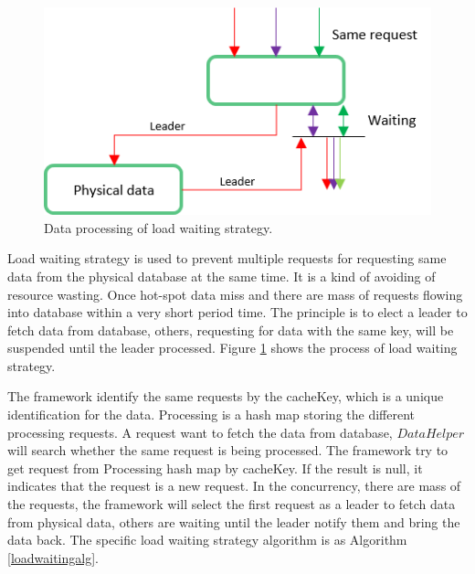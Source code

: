 \documentclass{singlecol-new}
\theoremstyle{TH}{
\newtheorem{lemma}{Lemma}
\newtheorem{theorem}[lemma]{Theorem}
\newtheorem{corrolary}[lemma]{Corrolary}
\newtheorem{conjecture}[lemma]{Conjecture}
\newtheorem{proposition}[lemma]{Proposition}
\newtheorem{claim}[lemma]{Claim}
\newtheorem{stheorem}[lemma]{Wrong Theorem}
}
\theoremstyle{THrm}{
\newtheorem{definition}{Definition}[section]
\newtheorem{question}{Question}[section]
\newtheorem{remark}{Remark}
\newtheorem{scheme}{Scheme}
}
\theoremstyle{THhit}{
\newtheorem{case}{Case}[section]
}
\begin{document}
\begin{figure} [htb]
\centering
\includegraphics[width=0.8\linewidth]{img/loadwaiting}
\caption{\label{loadwaiting}Data processing of load waiting strategy.}
\end{figure}

Load waiting strategy is used to prevent multiple requests for requesting same data from the physical database at the same time. It is a kind of avoiding of resource wasting. Once hot-spot data miss and there are mass of requests flowing into database within a very short period time. The principle is to elect a leader to fetch data from database, others, requesting for data with the same key, will be suspended until the leader processed. Figure \ref{loadwaiting} shows the process of load waiting strategy.

The framework identify the same requests by the cacheKey, which is a unique identification for the data. Processing is a hash map storing the different processing requests. A request want to fetch the data from database, $DataHelper$ will search whether the same request is being processed. The framework try to get request from Processing hash map by cacheKey. If the result is null, it indicates that the request is a new request. In the concurrency, there are mass of the requests, the framework will select the first request as a leader to fetch data from physical data, others are waiting until the leader notify them and bring the data back. The specific load waiting strategy algorithm is as Algorithm \ref{loadwaitingalg}.
\end{document}
